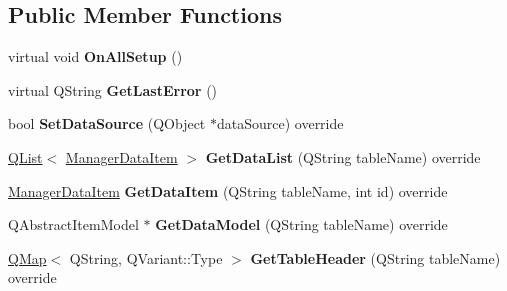 \subsection*{Public Member Functions}
\begin{DoxyCompactItemize}
\item 
virtual void {\bfseries On\+All\+Setup} ()\hypertarget{class_extendable_data_base_manager_plugin_a8331c3bd54725a10f79bcacde178774b}{}\label{class_extendable_data_base_manager_plugin_a8331c3bd54725a10f79bcacde178774b}

\item 
virtual Q\+String {\bfseries Get\+Last\+Error} ()\hypertarget{class_extendable_data_base_manager_plugin_a168d8e9dadf224d24c855fe376569857}{}\label{class_extendable_data_base_manager_plugin_a168d8e9dadf224d24c855fe376569857}

\item 
bool {\bfseries Set\+Data\+Source} (Q\+Object $\ast$data\+Source) override\hypertarget{class_extendable_data_base_manager_plugin_aa28d8bd15f2547b70e82452bdd8d0c70}{}\label{class_extendable_data_base_manager_plugin_aa28d8bd15f2547b70e82452bdd8d0c70}

\item 
\hyperlink{class_q_list}{Q\+List}$<$ \hyperlink{class_i_extendable_data_base_manager_plugin_1_1_manager_data_item}{Manager\+Data\+Item} $>$ {\bfseries Get\+Data\+List} (Q\+String table\+Name) override\hypertarget{class_extendable_data_base_manager_plugin_a2c2450f08baccb26e3aade32a5879f27}{}\label{class_extendable_data_base_manager_plugin_a2c2450f08baccb26e3aade32a5879f27}

\item 
\hyperlink{class_i_extendable_data_base_manager_plugin_1_1_manager_data_item}{Manager\+Data\+Item} {\bfseries Get\+Data\+Item} (Q\+String table\+Name, int id) override\hypertarget{class_extendable_data_base_manager_plugin_a1027e67334110767807dccd64cd4946d}{}\label{class_extendable_data_base_manager_plugin_a1027e67334110767807dccd64cd4946d}

\item 
Q\+Abstract\+Item\+Model $\ast$ {\bfseries Get\+Data\+Model} (Q\+String table\+Name) override\hypertarget{class_extendable_data_base_manager_plugin_a32a7f0127593a70e827b39a462cb6d02}{}\label{class_extendable_data_base_manager_plugin_a32a7f0127593a70e827b39a462cb6d02}

\item 
\hyperlink{class_q_map}{Q\+Map}$<$ Q\+String, Q\+Variant\+::\+Type $>$ {\bfseries Get\+Table\+Header} (Q\+String table\+Name) override\hypertarget{class_extendable_data_base_manager_plugin_a8ddef0ec955d01c3e59f5dec90eed26b}{}\label{class_extendable_data_base_manager_plugin_a8ddef0ec955d01c3e59f5dec90eed26b}


\end{DoxyCompactItemize}
